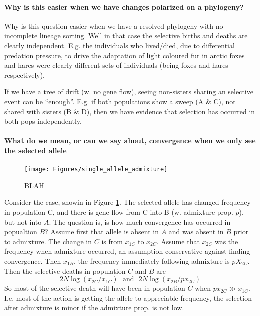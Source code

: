 \documentclass[a4paper,10pt]{article}
\begin{document}
\paragraph{Why is this easier when we have changes polarized on a phylogeny?}

Why is this question easier when we have a resolved phylogeny with
no-incomplete lineage sorting.
Well in that case the selective births and deaths are clearly
independent. E.g. the individuals who lived/died, due to differential
predation pressure, to drive the adaptation of light coloured fur in
arctic foxes and hares were clearly different sets of individuals
(being foxes and hares respectively). 




If we have a tree of drift (w. no gene flow), seeing non-sisters sharing an selective
event can be ``enough''. E.g. if both populations show a sweep (A \& C), not
shared with sisters (B \& D), then we have evidence that selection has occurred
in both pops independently. 

\paragraph{What do we mean, or can we say about, convergence when we only see the selected allele}


\begin{figure}
	\texttt{[image: Figures/single\_allele\_admixture]}
	\caption{BLAH}
	\label{fig:admix-graph}
\end{figure}
Consider the case, showin in Figure \ref{fig:admix-graph}. The selected allele has changed frequency in
population C, and there is gene flow from C into B (w. admixture
prop. $p$), but not into $A$. The question is, is how much convergence
has occurred in popualtion $B$?  
Assume first that allele is absent in
$A$ and was absent in $B$ prior to admixture.  The change in $C$ is
from $x_{1C}$ to $x_{2C}$. Assume that
$x_{2C}$ was the frequency when admixture occurred, an assumption conservative
against finding convergence. Then $x_{1B}$, the frequency immediately
following admixture is $pX_{2C}$. Then the selective deaths in
population $C$ and $B$ are
\begin{equation} 
2N\log(x_{2C}/x_{1C})~~~\textrm{and}~~~2N\log(x_{2B}/px_{2C})
\end{equation}
So most of the selective death will have been in population $C$ when
$px_{2C} \gg x_{1C}$. I.e. most of the action is getting the allele to
appreciable frequency, the selection after admixture is minor if the
admixture prop. is not low.\\ 
\end{document}
